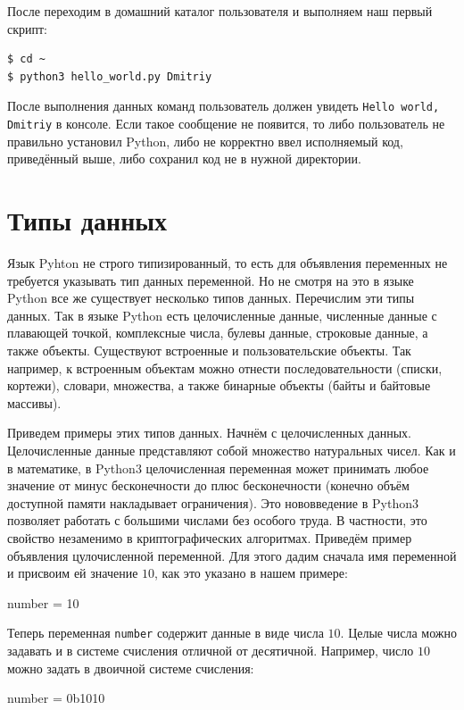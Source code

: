 После переходим в домашний каталог пользователя и выполняем наш первый скрипт:

\begin{verbatim}
$ cd ~
$ python3 hello_world.py Dmitriy
\end{verbatim}

После выполнения данных команд пользователь должен увидеть
\texttt{Hello world, Dmitriy} в консоле. Если такое сообщение не 
появится, то либо пользователь не правильно установил Python,
либо не корректно ввел исполняемый код, приведённый выше,
либо сохранил код не в нужной директории.

\section{Типы данных}

Язык Pyhton не строго типизированный, то есть для объявления
переменных не требуется указывать тип данных переменной. Но не смотря на
это в языке Python все же существует несколько типов данных.
Перечислим эти типы данных. Так в языке Python есть целочисленные данные,
численные данные с плавающей точкой, комплексные числа, булевы данные, строковые данные, а 
также объекты. Существуют встроенные и пользовательские объекты. Так например, к
встроенным объектам можно отнести последовательности (списки, кортежи), 
словари, множества, а также бинарные объекты (байты и байтовые массивы).

Приведем примеры этих типов данных. Начнём с целочисленных данных. 
Целочисленные данные представляют собой множество натуральных чисел. Как и в 
математике, в Python3 целочисленная переменная может принимать любое значение 
от минус бесконечности до плюс бесконечности (конечно объём доступной памяти
накладывает ограничения). Это нововведение в Python3 позволяет 
работать с большими числами без особого труда. В частности, это свойство незаменимо 
в криптографических алгоритмах. Приведём пример объявления цулочисленной переменной. 
Для этого дадим сначала имя переменной и присвоим ей значение $10$, как это указано 
в нашем примере:

\begin{python}
number = 10
\end{python}

Теперь переменная \texttt{number} содержит данные в виде числа $10$. Целые числа
можно задавать и в системе счисления отличной от десятичной. Например, число $10$ можно задать
в двоичной системе счисления:

\begin{python}
number = 0b1010
\end{python}

